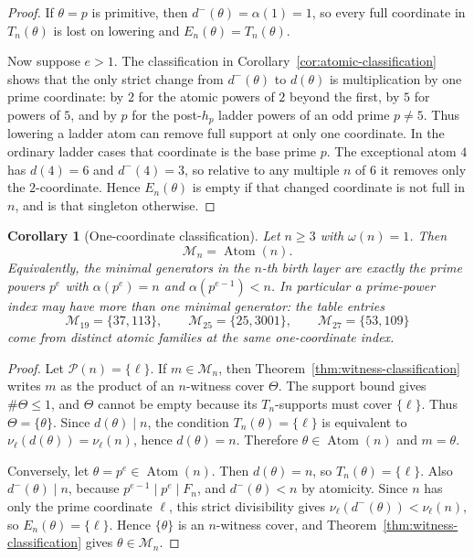\documentclass[11pt,letterpaper]{article}
\numberwithin{equation}{section}
\theoremstyle{plain}
\newtheorem{corollary}[theorem]{Corollary}
\theoremstyle{definition}
\theoremstyle{remark}
\DeclareMathOperator{\Atom}{Atom}
\begin{document}
\begin{proof}
If $\theta=p$ is primitive, then $d^-(\theta)=\alpha(1)=1$, so every full
coordinate in $T_n(\theta)$ is lost on lowering and
$E_n(\theta)=T_n(\theta)$.

Now suppose $e>1$. The classification in
Corollary~\ref{cor:atomic-classification} shows that the only strict change
from $d^-(\theta)$ to $d(\theta)$ is multiplication by one prime coordinate:
by $2$ for the atomic powers of $2$ beyond the first, by $5$ for powers of
$5$, and by $p$ for the post-$h_p$ ladder powers of an odd prime
$p\ne5$. Thus lowering a ladder atom can remove full support at only one
coordinate. In the ordinary ladder cases that coordinate is the base prime
$p$. The exceptional atom $4$ has $d(4)=6$ and $d^-(4)=3$, so relative to any
multiple $n$ of $6$ it removes only the $2$-coordinate. Hence
$E_n(\theta)$ is empty if that changed coordinate is not full in $n$, and is
that singleton otherwise.
\end{proof}

\begin{corollary}[One-coordinate classification]\label{cor:one-coordinate-classification}
Let \(n\ge3\) with \(\omega(n)=1\). Then
\[
\mathcal M_n=\Atom(n).
\]
Equivalently, the minimal generators in the \(n\)-th birth layer are exactly
the prime powers \(p^e\) with \(\alpha(p^e)=n\) and
\(\alpha(p^{e-1})<n\). In particular a prime-power index may have more than
one minimal generator: the table entries
\[
\mathcal M_{19}=\{37,113\},\qquad
\mathcal M_{25}=\{25,3001\},\qquad
\mathcal M_{27}=\{53,109\}
\]
come from distinct atomic families at the same one-coordinate index.
\end{corollary}

\begin{proof}
Let \(\mathcal P(n)=\{\ell\}\). If \(m\in\mathcal M_n\), then
Theorem~\ref{thm:witness-classification} writes \(m\) as the product of an
\(n\)-witness cover \(\Theta\). The support bound gives \(\#\Theta\le1\), and
\(\Theta\) cannot be empty because its \(T_n\)-supports must cover
\(\{\ell\}\). Thus \(\Theta=\{\theta\}\). Since \(d(\theta)\mid n\), the
condition \(T_n(\theta)=\{\ell\}\) is equivalent to
\(\nu_\ell(d(\theta))=\nu_\ell(n)\), hence \(d(\theta)=n\). Therefore
\(\theta\in\Atom(n)\) and \(m=\theta\).

Conversely, let \(\theta=p^e\in\Atom(n)\). Then \(d(\theta)=n\), so
\(T_n(\theta)=\{\ell\}\). Also \(d^-(\theta)\mid n\), because
\(p^{e-1}\mid p^e\mid F_n\), and \(d^-(\theta)<n\) by atomicity. Since \(n\)
has only the prime coordinate \(\ell\), this strict divisibility gives
\(\nu_\ell(d^-(\theta))<\nu_\ell(n)\), so
\(E_n(\theta)=\{\ell\}\). Hence \(\{\theta\}\) is an \(n\)-witness cover, and
Theorem~\ref{thm:witness-classification} gives
\(\theta\in\mathcal M_n\).
\end{proof}
\end{document}
